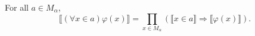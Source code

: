For all $a \in M_{\alpha}$,
$$\llbracket (\forall x \in a)\varphi(x) \rrbracket = \prod_{x \in M_{\alpha}} (\llbracket x \in a \rrbracket \Rightarrow \llbracket \varphi(x) \rrbracket).$$
